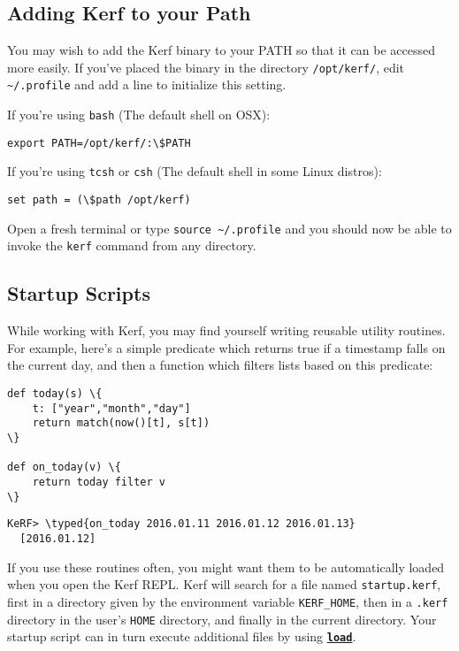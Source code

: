 \documentclass{article}
\newcommand{\typed}[1]{\textcolor{TealBlue}{#1}}
\newcommand{\primu}[2]{\hyperref[prim:#2]{\textbf{\texttt{#1}}}}
\newcommand{\prim}[1]{\primu{#1}{#1}}
\begin{document}
\subsection{Adding Kerf to your Path}

You may wish to add the Kerf binary to your PATH so that it can be accessed more easily. If you've placed the binary in the directory \texttt{/opt/kerf/}, edit \texttt{\textasciitilde/.profile} and add a line to initialize this setting.

\vspace{0.5cm}

If you're using \texttt{bash} (The default shell on OSX):
\begin{Verbatim}
export PATH=/opt/kerf/:\$PATH
\end{Verbatim}

If you're using \texttt{tcsh} or \texttt{csh} (The default shell in some Linux distros):
\begin{Verbatim}
set path = (\$path /opt/kerf)
\end{Verbatim}

Open a fresh terminal or type \texttt{source \textasciitilde/.profile} and you should now be able to invoke the \texttt{kerf} command from any directory.

\pagebreak
\subsection{Startup Scripts}

While working with Kerf, you may find yourself writing reusable utility routines. For example, here's a simple predicate which returns true if a timestamp falls on the current day, and then a function which filters lists based on this predicate:

\begin{Verbatim}
def today(s) \{
	t: ["year","month","day"]
	return match(now()[t], s[t])
\}

def on_today(v) \{
	return today filter v
\}
\end{Verbatim}
\begin{Verbatim}
KeRF> \typed{on_today 2016.01.11 2016.01.12 2016.01.13}
  [2016.01.12]
\end{Verbatim}

If you use these routines often, you might want them to be automatically loaded when you open the Kerf REPL. Kerf will search for a file named \texttt{startup.kerf}, first in a directory given by the environment variable \texttt{KERF\_HOME}, then in a \texttt{.kerf} directory in the user's \texttt{HOME} directory, and finally in the current directory. Your startup script can in turn execute additional files by using \prim{load}.
\end{document}

